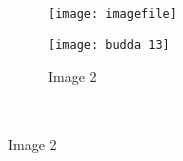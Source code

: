 
\usepackage{graphicx}
	\begin{figure}[h]
		\centering
		\begin{subfigure}[b]{0.45\textwidth}
		\centering
		\texttt{[image: imagefile]}
		\label{fig:image1}
	\end{subfigure}
		\hfill
	\begin{subfigure}[b]{0.45\textwidth}
		\centering
		\texttt{[image: budda 13]}
		\caption{Image 2}
		\label{fig:image2}
	\end{subfigure}
	\
	\end{figure}
